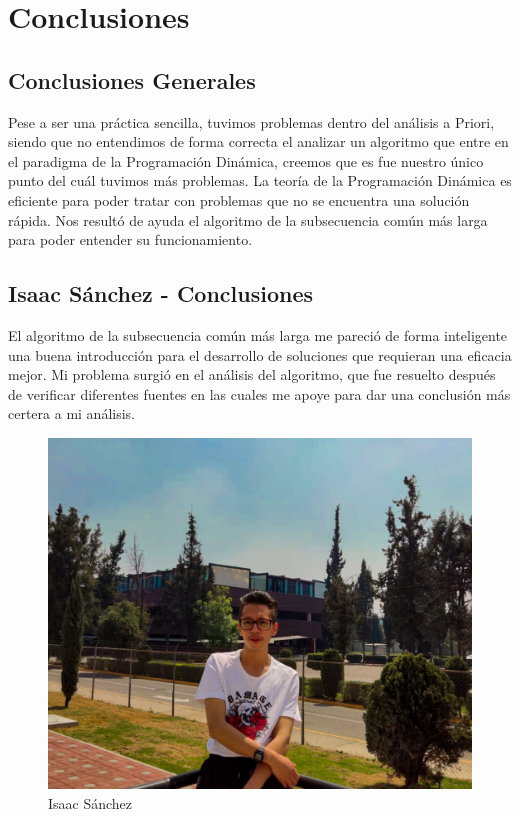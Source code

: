 \chapter{Conclusiones}

\section{Conclusiones Generales}
    
    Pese a ser una práctica sencilla, tuvimos problemas dentro del análisis a Priori, siendo que no entendimos de forma correcta el analizar un algoritmo que entre en el paradigma de la Programación Dinámica, creemos que es fue nuestro único punto del cuál tuvimos más problemas. La teoría de la Programación Dinámica es eficiente para poder tratar con problemas que no se encuentra una solución rápida. Nos resultó de ayuda el algoritmo de la subsecuencia común más larga para poder entender su funcionamiento.

\newpage
\section{Isaac Sánchez - Conclusiones}
    El algoritmo de la subsecuencia común más larga me pareció de forma inteligente una buena introducción para el desarrollo de soluciones que requieran una eficacia mejor. Mi problema surgió en el análisis del algoritmo, que fue resuelto después de verificar diferentes fuentes en las cuales me apoye para dar una conclusión más certera a mi análisis. 
    \begin{figure}[htp!]
            \centering
            \includegraphics[width=1 \textwidth]{Images/Fotos_Alumnos/274612600_2528992867236334_6677874837890685705_n.jpg}  
            \caption{Isaac Sánchez}
            \label{fig:my_label1}
        \end{figure}
    



